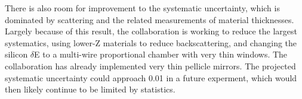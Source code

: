 There is also room for improvement to the systematic uncertainty, which is dominated by scattering and the related measurements of material thicknesses.  
Largely because of this result,
the collaboration is working to reduce the largest systematics,
using lower-Z materials to reduce backscattering, and changing the silicon
$\delta$E to a multi-wire proportional chamber with very thin windows.
The collaboration has already implemented very thin pellicle mirrors.
The projected systematic uncertainty could approach 0.01 in a future
experment, which would then likely continue to be limited by statistics.
























